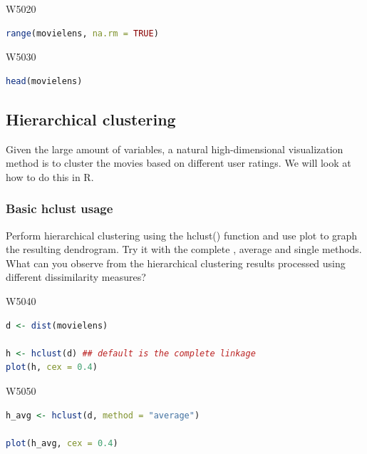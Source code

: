 
\begin{ocg}{}{W502}{0}
\begin{lstlisting}[language = R]
range(movielens, na.rm = TRUE)
\end{lstlisting}
\end{ocg}


\begin{ocg}{}{W503}{0}
\begin{lstlisting}[language = R]
head(movielens)
\end{lstlisting}
\end{ocg}

\subsection{Hierarchical clustering}

\indent 

Given the large amount of variables, a natural high-dimensional visualization method is to cluster the movies based on different user ratings. We will look at how to do this in R.

\subsubsection{Basic hclust usage}

\indent 

Perform hierarchical clustering using the hclust() function and use plot to graph the resulting dendrogram. Try it with the complete , average and single methods. What can you observe from the hierarchical clustering results processed using different dissimilarity measures?


\begin{ocg}{}{W504}{0}
\begin{lstlisting}[language = R]
d <- dist(movielens) 

h <- hclust(d) ## default is the complete linkage
plot(h, cex = 0.4)
\end{lstlisting}
\end{ocg}


\begin{ocg}{}{W505}{0}
\begin{lstlisting}[language = R]
h_avg <- hclust(d, method = "average")

plot(h_avg, cex = 0.4)
\end{lstlisting}
\end{ocg}

